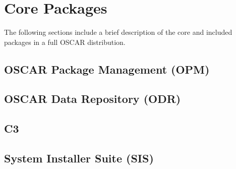 %
%
%

\section{Core Packages}

The following sections include a brief description of the core and
included packages in a full OSCAR distribution.

\subsection{OSCAR Package Management (OPM)}

\subsection{OSCAR Data Repository (ODR)}

\subsection{C3}

\subsection{System Installer Suite (SIS)}


